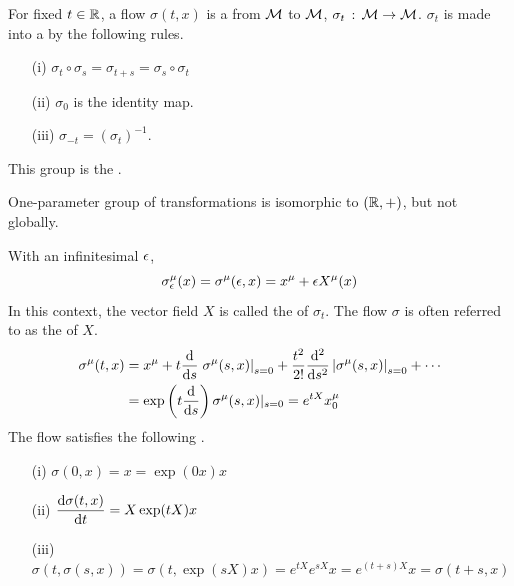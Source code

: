 \documentclass[a4paper, 10pt]{article}
\begin{document}
\begin{definition}
    For fixed $t \in \mathbb{R}$, a flow $\sigma(t, x)$ is a  from $\mathcal{M}$ to $\mathcal{M}$, $\sigma_{t} \,:\, \mathcal{M} \rightarrow \mathcal{M}$. $\sigma_{t}$ is made into a  by the following rules.
    \begin{itemize}
        \item[(i)] $\sigma_{t} \circ \sigma_{s} = \sigma_{t+s} = \sigma_{s} \circ \sigma_{t}$
        \item[(ii)] $\sigma_{0}$ is the identity map.
        \item[(iii)] $\sigma_{-t} = (\sigma_{t})^{-1}$.
    \end{itemize}
    This group is the .
\end{definition}

\begin{remark}
    One-parameter group of transformations is  isomorphic to $(\mathbb{R}, +)$, but not globally.
\end{remark}
\newpage


\begin{obs}
    With an infinitesimal $\epsilon$,
    \[ \sigma_{\epsilon}^{\mu}(x) = \sigma^{\mu}(\epsilon, x) = x^{\mu} + \epsilon X^{\mu}(x) \]
    In this context, the vector field $X$ is called the  of $\sigma_{t}$. The flow $\sigma$ is often referred to as the  of $X$.
    \begin{align*}
        \sigma^{\mu}(t,x) &= x^{\mu} + t\frac{\mathrm{d}}{\mathrm{d}{s}}\left.\sigma^{\mu}(s,x)\right|_{s=0} + \frac{t^{2}}{2!}\frac{\mathrm{d}^{2}}{\mathrm{d}{s}^{2}}\left|\sigma^{\mu}(s,x)\right|_{s=0} + \cdots \\
        &= \exp\left(t\frac{\mathrm{d}}{\mathrm{d}{s}}\right)\sigma^{\mu}(s,x)|_{s=0} = e^{tX}x^{\mu}_{0}
    \end{align*}
    The flow satisfies the following .
    \begin{itemize}
        \item[(i)] $\sigma(0, x) = x = \exp(0x)x$
        \item[(ii)] $\displaystyle{\frac{\mathrm{d}\sigma(t,x)}{\mathrm{d}{t}} = X\exp(tX)x}$
        \item[(iii)] $\sigma(t, \sigma(s,x)) = \sigma(t, \exp(sX)x) = e^{tX}e^{sX}x = e^{(t+s)X}x = \sigma(t+s, x)$
    \end{itemize}
\end{obs}
\end{document}
